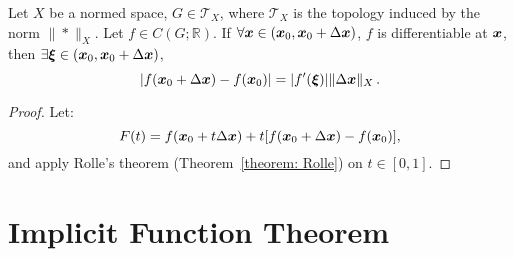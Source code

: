 \documentclass[openany]{book}
\begin{document}
\begin{theorem}
	\label{theorem: Lagrange's finite-increment}
	Let $X$ be a normed space, $G \in \mathscr T_X$, where $\mathscr T_X$ is the topology induced by the norm $\|*\|_X$. 
	Let $f \in C(G; \mathbb R)$. 
	If $\forall \boldsymbol{x} \in (\boldsymbol{x}_0, \boldsymbol{x}_0 + \Delta \boldsymbol{x})$, $f$ is differentiable at $\boldsymbol{x}$, then $\exists \boldsymbol{\xi} \in (\boldsymbol{x}_0, \boldsymbol{x}_0 + \Delta \boldsymbol{x})$, 
	\begin{equation*}
		|f(\boldsymbol{x}_0 + \Delta \boldsymbol{x}) - f(\boldsymbol{x}_0)| 
			= |f'(\boldsymbol{\xi})|  \|\Delta \boldsymbol{x}\|_X\,.
	\end{equation*}
\end{theorem}
\begin{proof}
	Let:
	\begin{equation*}
		F(t) = f(\boldsymbol{x}_0 + t \Delta \boldsymbol{x}) + t [f(\boldsymbol{x}_0 + \Delta \boldsymbol{x}) - f(\boldsymbol{x}_0)],
	\end{equation*}
	and apply Rolle's theorem (Theorem~\ref{theorem: Rolle}) on $t \in [0, 1]$.
\end{proof}

\section{Implicit Function Theorem}
\end{document}
